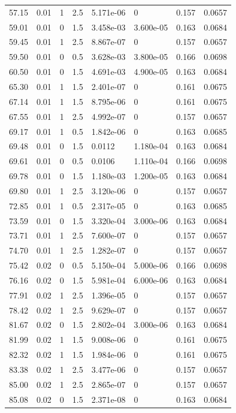 \documentclass[preview]{standalone}
\begin{document}
{{{\begin{tabular}{L{1.2cm}C{1.2cm} C{0.3cm}C{0.5cm} C{1.4cm}C{1.4cm} C{1.4cm}C{1.4cm}}
  57.15  &  0.01  & 1     & 2.5 &  5.171e-06  & 0  & 0.157 &  0.0657   \\ 
  59.01  &  0.01  & 0     & 1.5 &  3.458e-03  & 3.600e-05  & 0.163 &  0.0684   \\ 
  59.45  &  0.01  & 1     & 2.5 &  8.867e-07  & 0  & 0.157 &  0.0657   \\ 
  59.50  &  0.01  & 0     & 0.5 &  3.628e-03  & 3.800e-05  & 0.166 &  0.0698   \\ 
  60.50  &  0.01  & 0     & 1.5 &  4.691e-03  & 4.900e-05  & 0.163 &  0.0684   \\ 
  65.30  &  0.01  & 1     & 1.5 &  2.401e-07  & 0  & 0.161 &  0.0675   \\ 
  67.14  &  0.01  & 1     & 1.5 &  8.795e-06  & 0  & 0.161 &  0.0675   \\ 
  67.55  &  0.01  & 1     & 2.5 &  4.992e-07  & 0  & 0.157 &  0.0657   \\ 
  69.17  &  0.01  & 1     & 0.5 &  1.842e-06  & 0  & 0.163 &  0.0685   \\ 
  69.48  &  0.01  & 0     & 1.5 &  0.0112  & 1.180e-04  & 0.163 &  0.0684   \\ 
  69.61  &  0.01  & 0     & 0.5 &  0.0106  & 1.110e-04  & 0.166 &  0.0698   \\ 
  69.78  &  0.01  & 0     & 1.5 &  1.180e-03  & 1.200e-05  & 0.163 &  0.0684   \\ 
  69.80  &  0.01  & 1     & 2.5 &  3.120e-06  & 0  & 0.157 &  0.0657   \\ 
  72.85  &  0.01  & 1     & 0.5 &  2.317e-05  & 0  & 0.163 &  0.0685   \\ 
  73.59  &  0.01  & 0     & 1.5 &  3.320e-04  & 3.000e-06  & 0.163 &  0.0684   \\ 
  73.71  &  0.01  & 1     & 2.5 &  7.600e-07  & 0  & 0.157 &  0.0657   \\ 
  74.70  &  0.01  & 1     & 2.5 &  1.282e-07  & 0  & 0.157 &  0.0657   \\ 
  75.42  &  0.02  & 0     & 0.5 &  5.150e-04  & 5.000e-06  & 0.166 &  0.0698   \\ 
  76.16  &  0.02  & 0     & 1.5 &  5.981e-04  & 6.000e-06  & 0.163 &  0.0684   \\ 
  77.91  &  0.02  & 1     & 2.5 &  1.396e-05  & 0  & 0.157 &  0.0657   \\ 
  78.42  &  0.02  & 1     & 2.5 &  9.629e-07  & 0  & 0.157 &  0.0657   \\ 
  81.67  &  0.02  & 0     & 1.5 &  2.802e-04  & 3.000e-06  & 0.163 &  0.0684   \\ 
  81.99  &  0.02  & 1     & 1.5 &  9.008e-06  & 0  & 0.161 &  0.0675   \\ 
  82.32  &  0.02  & 1     & 1.5 &  1.984e-06  & 0  & 0.161 &  0.0675   \\ 
  83.38  &  0.02  & 1     & 2.5 &  3.477e-06  & 0  & 0.157 &  0.0657   \\ 
  85.00  &  0.02  & 1     & 2.5 &  2.865e-07  & 0  & 0.157 &  0.0657   \\ 
  85.08  &  0.02  & 0     & 1.5 &  2.371e-08  & 0  & 0.163 &  0.0684   \\ 
\hline 
\end{tabular} 

}}}
\end{document}
